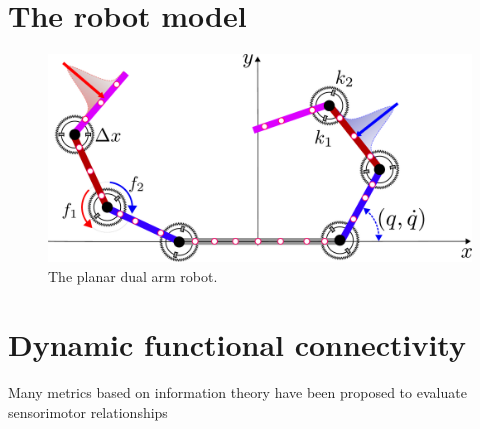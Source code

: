 \section{The robot model}
\TODO

\begin{figure}[!th]
	\centering
	\includegraphics[width=0.9\columnwidth]{fig/extended_dual_arm_robot.pdf}
	\caption{The planar dual arm robot.}
	\label{fig:extended_dual_arm_robot}
\end{figure}

\section{Dynamic functional connectivity}

Many metrics based on information theory have been proposed to evaluate sensorimotor relationships \cite{Bonsignorio2020EntropyBasedMetrics}

